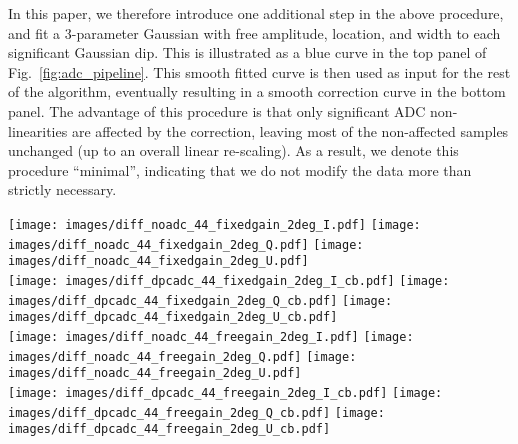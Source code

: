 \documentclass[twocolumn]{aa}
\newcommand{\BP}{\textsc{BeyondPlanck}}
\begin{document}
In this paper, we therefore introduce one additional step in the above procedure, and fit a 3-parameter Gaussian with free amplitude, location, and width to each significant Gaussian dip. This is illustrated as a blue curve in the top panel of Fig.~\ref{fig:adc_pipeline}. This smooth fitted curve is then used as input for the rest of the algorithm, eventually resulting in a smooth correction curve in the bottom panel. The advantage of this procedure is that only significant ADC non-linearities are affected by the correction, leaving most of the non-affected samples unchanged (up to an overall linear re-scaling). As a result, we denote this procedure ``minimal'', indicating that we do not modify the data more than strictly necessary. 

\begin{figure*}[hbtp]

\texttt{[image: images/diff\_noadc\_44\_fixedgain\_2deg\_I.pdf]}
\texttt{[image: images/diff\_noadc\_44\_fixedgain\_2deg\_Q.pdf]}
\texttt{[image: images/diff\_noadc\_44\_fixedgain\_2deg\_U.pdf]}\\

\texttt{[image: images/diff\_dpcadc\_44\_fixedgain\_2deg\_I\_cb.pdf]}
\texttt{[image: images/diff\_dpcadc\_44\_fixedgain\_2deg\_Q\_cb.pdf]}
\texttt{[image: images/diff\_dpcadc\_44\_fixedgain\_2deg\_U\_cb.pdf]}\\

\texttt{[image: images/diff\_noadc\_44\_freegain\_2deg\_I.pdf]}
\texttt{[image: images/diff\_noadc\_44\_freegain\_2deg\_Q.pdf]}
\texttt{[image: images/diff\_noadc\_44\_freegain\_2deg\_U.pdf]}\\

\texttt{[image: images/diff\_dpcadc\_44\_freegain\_2deg\_I\_cb.pdf]}
\texttt{[image: images/diff\_dpcadc\_44\_freegain\_2deg\_Q\_cb.pdf]}
\texttt{[image: images/diff\_dpcadc\_44\_freegain\_2deg\_U\_cb.pdf]}

\caption{Effect of the ADC corrections on the 44\,GHz sky maps. (\textit{Top row:}) Difference between the \BP\ ADC corrections and no ADC corrections with the gain solution fixed. (\textit{Top middle row:}) Difference between the \BP\ ADC corrections and no ADC corrections with gain sampling enabled. (\textit{Bottom middle row:}) Difference between the \BP\ ADC corrections and the DPC ADC corrections, with the gain solution fixed. (\textit{Bottom row:})  Difference between the \BP\ ADC corrections and the DPC ADC corrections, with gain sampling enabled. }
\label{fig:sky_maps_44}
\end{figure*}
\end{document}
